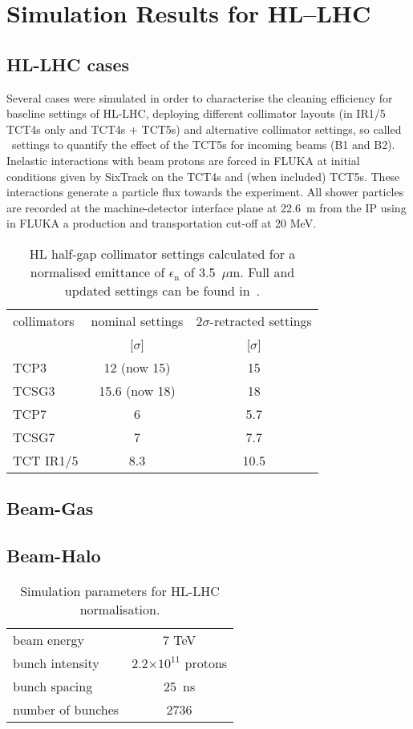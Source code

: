 \section{Simulation Results for HL--LHC\label{hllhcResults}}
\subsection{HL-LHC cases}
Several cases were simulated in order to characterise the cleaning efficiency for baseline settings of HL-LHC, deploying different collimator layouts (in IR1/5 TCT4s only and TCT4s + TCT5s) and alternative collimator settings, so called \twosigmaret~settings to quantify the effect of the TCT5s for incoming beams (B1 and B2). Inelastic interactions with beam protons are forced in FLUKA at initial conditions given by SixTrack on the TCT4s and (when included) TCT5s. These interactions generate a particle flux towards the experiment. All shower particles are recorded at the machine-detector interface plane at 22.6~m from the IP using in FLUKA a production and transportation cut-off at 20 MeV.

\begin{table}%
   \centering
   \caption{HL half-gap collimator settings calculated for a normalised emittance of $\epsilon_{\mathrm{n}}$ of 3.5~$\mu$m. Full and updated settings can be found in~\cite{collSettRef}.}

   \begin{tabular}{l|c|c}
       \hline
       collimators &        nominal settings & $2\sigma$-retracted settings\\
                   &         [$\sigma$] &  [$\sigma$]\\
       \hline
       TCP3 & 12 (now 15) & 15 \\
       TCSG3 & 15.6 (now 18)& 18 \\
       TCP7 & 6 & 5.7 \\
       TCSG7 & 7 & 7.7 \\
       TCT IR1/5 & 8.3 & 10.5 \\
       \hline
   \end{tabular}
   \label{collSettings}
\end{table}


\subsection{Beam-Gas}
\subsection{Beam-Halo }
\begin{table}%
   \centering
   \caption{Simulation parameters for HL-LHC normalisation.}
   \begin{tabular}{l|c}
       \hline
       beam energy & 7 TeV \\
       bunch intensity & 2.2$\times 10^{11}$ protons\\
       bunch spacing & 25~ns \\
       number of bunches & 2736 \\
       \hline
   \end{tabular}
   \label{hlscenario}
\end{table}

